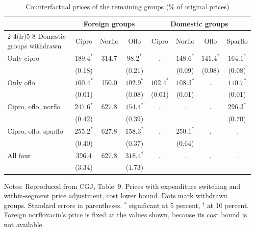 \begin{table}[htbp]
\centering
\caption{Counterfactual prices of the remaining groups (\% of original prices)}\label{tab:05-cgj-table9}
\footnotesize
\setlength{\tabcolsep}{4pt}
\begin{tabular}{lccccccc}
\toprule
 & \multicolumn{3}{c}{Foreign groups} & \multicolumn{4}{c}{Domestic groups} \\
\cmidrule(lr){2-4}\cmidrule(lr){5-8}
Domestic groups withdrawn & Cipro & Norflo & Oflo & Cipro & Norflo & Oflo & Sparflo \\
\midrule
Only cipro & $189.4^{*}$ & 314.7 & $98.2^{*}$ & . & $148.6^{*}$ & $141.4^{*}$ & $164.1^{*}$ \\
 & (0.18) & & (0.21) & & (0.09) & (0.08) & (0.08) \\
Only oflo & $100.4^{*}$ & 150.0 & $102.9^{*}$ & $102.4^{*}$ & $108.3^{*}$ & . & $110.7^{*}$ \\
 & (0.01) & & (0.08) & (0.01) & (0.01) & & (0.01) \\
Cipro, oflo, norflo & $247.6^{*}$ & 627.8 & $154.4^{*}$ & . & . & . & $296.3^{*}$ \\
 & (0.42) & & (0.39) & & & & (0.70) \\
Cipro, oflo, sparflo & $255.2^{*}$ & 627.8 & $158.3^{*}$ & . & $250.1^{*}$ & . & . \\
 & (0.40) & & (0.37) & & (0.64) & & \\
All four & 396.4 & 627.8 & $318.4^{\dagger}$ & . & . & . & . \\
 & (3.34) & & (1.73) & & & & \\
\bottomrule
\end{tabular}
\par\smallskip
\begin{minipage}{0.95\textwidth}\footnotesize
Notes: Reproduced from CGJ, Table~9. Prices with expenditure switching and within-segment price adjustment, cost
lower bound. Dots mark withdrawn groups. Standard errors in parentheses. $^{*}$ significant at 5 percent,
$^{\dagger}$ at 10 percent. Foreign norfloxacin's price is fixed at the values shown, because its cost bound is not
available.
\end{minipage}
\end{table}

